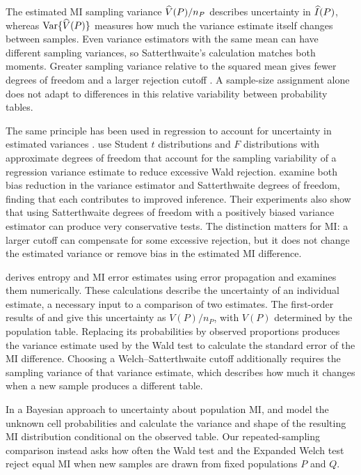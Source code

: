 The estimated MI sampling variance \(\widehat V(P)/n_P\) describes uncertainty
in \(\widehat I(P)\), whereas \(\operatorname{Var}\{\widehat V(P)\}\) measures how much the
variance estimate itself changes between samples. Even variance estimators
with the same mean can have different sampling variances, so Satterthwaite's
calculation matches both moments. Greater sampling variance relative to the
squared mean gives fewer degrees of freedom and a larger rejection cutoff
\citep{satterthwaite1946}. A sample-size assignment alone does not adapt
to differences in this relative variability between probability tables.

The same principle has been used in regression to account for
uncertainty in estimated variances
\citep{panwall2002,bell2002,kauermann2001,fay2001,imbens2016}.
\citet{panwall2002} use Student \(t\) distributions and \(F\) distributions with
approximate degrees of freedom that account for the sampling variability
of a regression variance estimate to reduce excessive Wald rejection.
\citet{bell2002} examine both
bias reduction in the variance estimator and Satterthwaite degrees of
freedom, finding that each contributes to improved inference. Their
experiments also show that using Satterthwaite degrees of freedom with a
positively biased variance estimator can produce very conservative tests.
The distinction matters for MI: a larger cutoff can compensate for some
excessive rejection, but it does not change the estimated variance or
remove bias in the estimated MI difference.

\medskip
{}

\citet{roulston1999} derives entropy and MI error estimates
using error propagation and examines them numerically. These calculations
describe the uncertainty of an individual estimate, a necessary input to a
comparison of two estimates.
The first-order results of \citet{moddemeijer1989} and
\citet{brillinger2004} give this uncertainty as \(V(P)/n_P\), with
\(V(P)\) determined by the population table. Replacing its probabilities by observed proportions produces the variance
estimate used by the Wald test to calculate the standard error of the MI difference.
Choosing a Welch--Satterthwaite cutoff additionally requires the sampling
variance of that variance estimate, which describes how much it changes
when a new sample produces a different table.

In a Bayesian approach to uncertainty about population MI,
\citet{hutter2002} and \citet{hutterzaffalon2005} model the unknown cell
probabilities and calculate the variance and shape of the resulting MI
distribution conditional on the observed table. Our repeated-sampling
comparison instead asks how often the Wald test and the Expanded Welch test reject
equal MI when new samples are drawn from fixed populations \(P\) and \(Q\).

